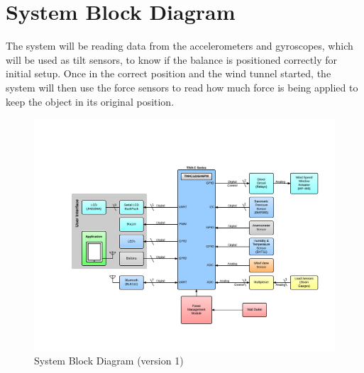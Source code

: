 \section{System Block Diagram}


	The system will be reading data from the accelerometers and gyroscopes, which will be used as tilt sensors, to know if the balance is positioned correctly for initial setup. Once in the correct position and the wind tunnel started, the system will then use the force sensors to read how much force is being applied to keep the object in its original position. 

	\begin{figure}[H]
		\centering
			\includegraphics[scale=0.30]{img/blockdiagramv2}
		\caption{System Block Diagram (version 1)}
	\end{figure}